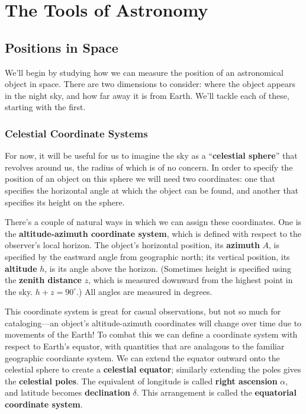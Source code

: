 \documentclass[../a062main.tex]{subfiles}
\begin{document}
\chapter{The Tools of Astronomy}
\section{Positions in Space}
We'll begin by studying how we can measure the position of an astronomical object in space.
There are two dimensions to consider: where the object appears in the night sky, and how far away it is from Earth.
We'll tackle each of these, starting with the first.

\subsection*{Celestial Coordinate Systems}
For now, it will be useful for us to imagine the sky as a ``\textbf{celestial sphere}'' that revolves around us, the radius of which is of no concern.
In order to specify the position of an object on this sphere we will need two coordinates: one that specifies the horizontal angle at which the object can be found, and another that specifies its height on the sphere.

There's a couple of natural ways in which we can assign these coordinates.
One is the \textbf{altitude-azimuth coordinate system}, which is defined with respect to the observer's local horizon.
The object's horizontal position, its \textbf{azimuth} $A$, is specified by the eastward angle from geographic north; its vertical position, its \textbf{altitude} $h$, is its angle above the horizon.
(Sometimes height is specified using the \textbf{zenith distance} $z$, which is measured downward from the highest point in the sky. $h + z = 90^\circ$.)
All angles are measured in degrees.

This coordinate system is great for casual observations, but not so much for cataloging---an object's altitude-azimuth coordinates will change over time due to movements of the Earth!
To combat this we can define a coordinate system with respect to Earth's equator, with quantities that are analagous to the familiar geographic coordiante system.
We can extend the equator outward onto the celestial sphere to create a \textbf{celestial equator}; similarly extending the poles gives the \textbf{celestial poles}.
The equivalent of longitude is called \textbf{right ascension} $\alpha$, and latitude becomes \textbf{declination} $\delta$.
This arrangement is called the \textbf{equatorial coordinate system}.
\end{document}
